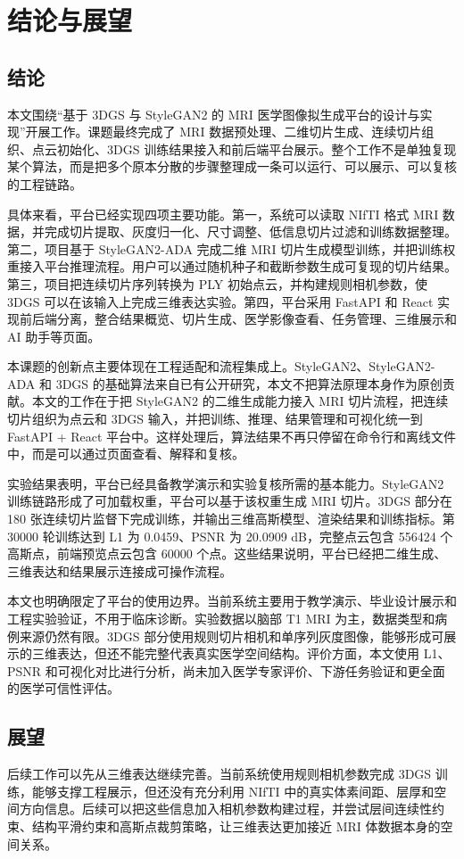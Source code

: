 \chapter{结论与展望}

\section{结论}
本文围绕“基于 3DGS 与 StyleGAN2 的 MRI 医学图像拟生成平台的设计与实现”开展工作。课题最终完成了 MRI 数据预处理、二维切片生成、连续切片组织、点云初始化、3DGS 训练结果接入和前后端平台展示。整个工作不是单独复现某个算法，而是把多个原本分散的步骤整理成一条可以运行、可以展示、可以复核的工程链路。

具体来看，平台已经实现四项主要功能。第一，系统可以读取 NIfTI 格式 MRI 数据，并完成切片提取、灰度归一化、尺寸调整、低信息切片过滤和训练数据整理。第二，项目基于 StyleGAN2-ADA 完成二维 MRI 切片生成模型训练，并把训练权重接入平台推理流程。用户可以通过随机种子和截断参数生成可复现的切片结果。第三，项目把连续切片序列转换为 PLY 初始点云，并构建规则相机参数，使 3DGS 可以在该输入上完成三维表达实验。第四，平台采用 FastAPI 和 React 实现前后端分离，整合结果概览、切片生成、医学影像查看、任务管理、三维展示和 AI 助手等页面。

本课题的创新点主要体现在工程适配和流程集成上。StyleGAN2、StyleGAN2-ADA 和 3DGS 的基础算法来自已有公开研究，本文不把算法原理本身作为原创贡献。本文的工作在于把 StyleGAN2 的二维生成能力接入 MRI 切片流程，把连续切片组织为点云和 3DGS 输入，并把训练、推理、结果管理和可视化统一到 FastAPI + React 平台中。这样处理后，算法结果不再只停留在命令行和离线文件中，而是可以通过页面查看、解释和复核。

实验结果表明，平台已经具备教学演示和实验复核所需的基本能力。StyleGAN2 训练链路形成了可加载权重，平台可以基于该权重生成 MRI 切片。3DGS 部分在 180 张连续切片监督下完成训练，并输出三维高斯模型、渲染结果和训练指标。第 30000 轮训练达到 L1 为 0.0459、PSNR 为 20.0909 dB，完整点云包含 556424 个高斯点，前端预览点云包含 60000 个点。这些结果说明，平台已经把二维生成、三维表达和结果展示连接成可操作流程。

本文也明确限定了平台的使用边界。当前系统主要用于教学演示、毕业设计展示和工程实验验证，不用于临床诊断。实验数据以脑部 T1 MRI 为主，数据类型和病例来源仍然有限。3DGS 部分使用规则切片相机和单序列灰度图像，能够形成可展示的三维表达，但还不能完整代表真实医学空间结构。评价方面，本文使用 L1、PSNR 和可视化对比进行分析，尚未加入医学专家评价、下游任务验证和更全面的医学可信性评估。

\section{展望}
后续工作可以先从三维表达继续完善。当前系统使用规则相机参数完成 3DGS 训练，能够支撑工程展示，但还没有充分利用 NIfTI 中的真实体素间距、层厚和空间方向信息。后续可以把这些信息加入相机参数构建过程，并尝试层间连续性约束、结构平滑约束和高斯点裁剪策略，让三维表达更加接近 MRI 体数据本身的空间关系。

